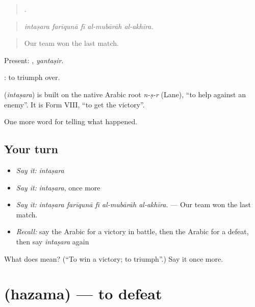 \begin{quote}
    .
\end{quote}

\begin{quote}
\emph{intaṣara farīqunā fī al-mubārāh al-akhīra.}
\end{quote}

\begin{quote}
Our team won the last match.
\end{quote}

Present: , \emph{yantaṣir}.

 : to triumph over.

\begin{cousinweb}
\textbf{} (\emph{intaṣara}) is built on the native Arabic root \emph{n-ṣ-r} (Lane), \textquotedblleft{}to help against an enemy\textquotedblright{}. It is Form VIII, \textquotedblleft{}to get the victory\textquotedblright{}.
\end{cousinweb}

\begin{grammarlens}[title={What you've built}]
One more word for telling what happened.
\end{grammarlens}

\subsection*{Your turn}
\begin{itemize}
\raggedright
  \item \emph{Say it:} \emph{intaṣara}
  \item \emph{Say it:} \emph{intaṣara}, once more
  \item \emph{Say it:} \emph{intaṣara farīqunā fī al-mubārāh al-akhīra.} — Our team won the last match.
  \item \emph{Recall:} say the Arabic for a victory in battle, then the Arabic for a defeat, then say \emph{intaṣara} again
\end{itemize}

\begin{tcolorbox}[breakable,colback=teal!4,colframe=teal!35!black,title={Before you move on}]
What does  mean? (\textquotedblleft{}To win a victory; to triumph\textquotedblright{}.) Say it once more.
\end{tcolorbox}
\section[\texorpdfstring{\ar{هزم} (hazama)}{هزم (hazama)}]{ (hazama) — to defeat}


